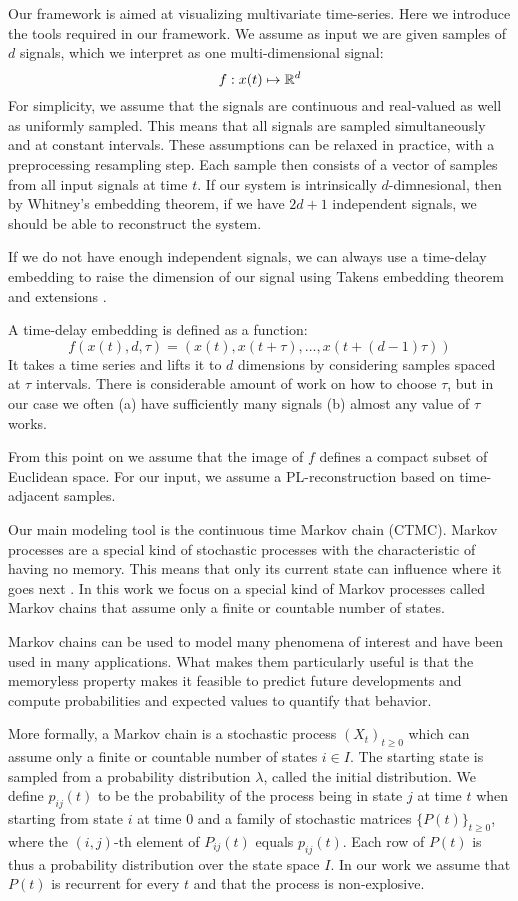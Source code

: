 \label{sec:preliminaries}
Our framework is aimed at visualizing multivariate time-series. Here we introduce the tools required in our framework. We assume as input we are given samples of $d$ signals, which we interpret as one multi-dimensional signal:
$$f: x(t)\mapsto \mathbb{R}^d$$
For simplicity, we assume that the signals are continuous and real-valued as well as uniformly sampled. This means that all signals are sampled simultaneously and at constant intervals. These assumptions can be relaxed in practice, with a preprocessing resampling step.  Each sample then consists of a vector of samples from all input signals at time $t$. If our system is intrinsically $d$-dimnesional, then by Whitney's embedding theorem, if we have $2d+1$ independent signals, we should be able to reconstruct the system.

If we do not have enough independent signals, we can always use a time-delay embedding to raise the dimension of our signal using Takens embedding theorem \cite{} and extensions \cite{}.  

A time-delay embedding is defined as a function:
$$ f(x(t),d,\tau) = (x(t),x(t+\tau),\ldots,x(t+(d-1)\tau) )$$
It takes a time series and lifts it to $d$ dimensions by considering samples spaced at $\tau$ intervals. There is considerable amount of work on how to choose $\tau$, but in our case we often (a) have sufficiently many signals (b) almost any value of $\tau$ works. 

From this point on we  assume that the image of $f$ defines a compact subset of Euclidean space. For our input, we assume a PL-reconstruction based on time-adjacent samples. 

Our main modeling tool is the continuous time Markov chain (CTMC). Markov processes are a special kind of stochastic processes with the characteristic of having no memory. This means that only its current state can influence where it goes next \cite{norris1998markov}. In this work we focus on a special kind of Markov processes called Markov chains that assume only a finite or countable number of states.

Markov chains can be used to model many phenomena of interest and have been used in many
applications. What makes them particularly useful is that the memoryless
property makes it feasible to predict future developments and compute probabilities and
expected values to quantify that behavior.

More formally, a Markov chain is a stochastic process $(X_t)_{t \ge 0}$ which can assume 
only a finite or countable number of states $i \in I$. The starting state
is sampled from a probability distribution $\lambda$, called the initial distribution.
We define $p_{ij}(t)$ to be the probability of the process being in state $j$ at time $t$
when starting from state $i$ at time $0$ and a family of stochastic matrices $\{P(t)\}_{t \ge 0}$,
where the $(i,j)$-th element of $P_{ij}(t)$ equals $p_{ij}(t)$.
Each row of $P(t)$ is thus a probability distribution over the state space $I$. In our
work we assume that $P(t)$ is recurrent for every $t$ and that the process is non-explosive.

